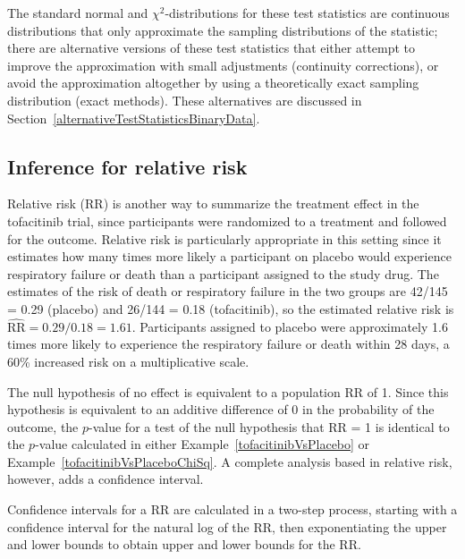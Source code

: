 The standard normal and $\chi^2$-distributions for these test statistics are continuous distributions that only approximate the sampling distributions of the statistic; there are alternative versions of these test statistics that either attempt to improve the approximation with small adjustments (continuity corrections), or avoid the approximation altogether by using a theoretically exact sampling distribution (exact methods).  These alternatives are discussed in Section~\ref{alternativeTestStatisticsBinaryData}.

\subsection{Inference for relative risk}
\label{infereneRelativeRisk}

Relative risk (RR) is another way to summarize the treatment effect in the tofacitinib trial, since participants were randomized to a treatment and followed for the outcome. Relative risk is particularly appropriate in this setting since it estimates how many times more likely a participant on placebo would experience respiratory failure or death than a participant assigned to the study drug. The estimates of the risk of death or respiratory failure in the two groups are 42/145 = 0.29 (placebo) and 26/144 = 0.18 (tofacitinib), so the estimated relative risk is $\widehat{\text{RR}} = 0.29/0.18 = 1.61$. Participants assigned to placebo were approximately 1.6 times more likely to experience the respiratory failure or death within 28 days, a 60\% increased risk on a multiplicative scale.

The null hypothesis of no effect is equivalent to a population RR of 1. Since this hypothesis is equivalent to an additive difference of 0 in the probability of the outcome, the $p$-value for a test of the null hypothesis that RR = 1 is identical to the $p$-value calculated in either Example~\ref{tofacitinibVsPlacebo} or Example~\ref{tofacitinibVsPlaceboChiSq}.  A complete analysis based in relative risk, however, adds a confidence interval.
 
Confidence intervals for a RR are calculated in a two-step process, starting with a confidence interval for the natural log of the RR, then exponentiating the upper and lower bounds to obtain upper and lower bounds for the RR.

